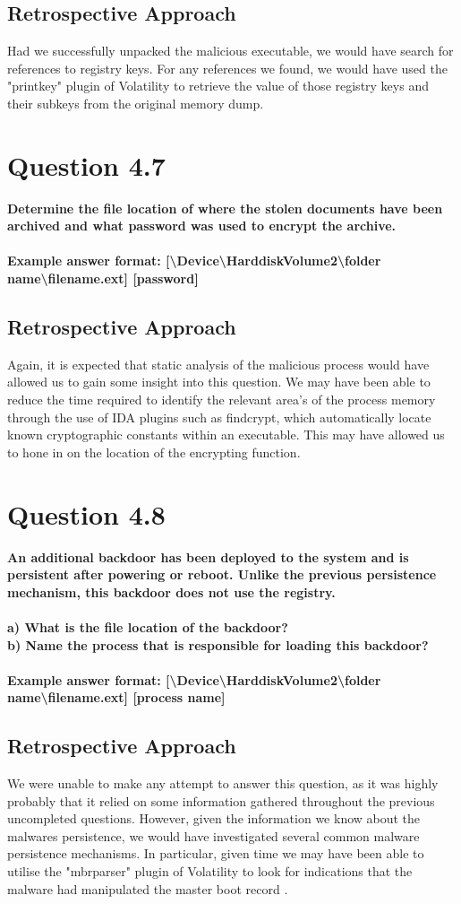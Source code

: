 \subsection{Retrospective Approach}
Had we successfully unpacked the malicious executable, we would have search for references to registry keys. For any references we found, we would have used the "printkey" plugin of Volatility to retrieve the value of those registry keys and their subkeys from the original memory dump.
\section{Question 4.7}
\textbf{Determine the file location of where the stolen documents have been
archived and what password was used to encrypt the archive.
\\\\
Example answer format:
[\textbackslash{}Device\textbackslash{}HarddiskVolume2\textbackslash{}folder
name\textbackslash{}filename.ext] [password]}
\subsection{Retrospective Approach}
Again, it is expected that static analysis of the malicious process would have allowed us to gain some insight into this question. We may have been able to reduce the time required to identify the relevant area's of the process memory through the use of IDA plugins such as findcrypt, which automatically locate known cryptographic constants within an executable. This may have allowed us to hone in on the location of the encrypting function. 
\section{Question 4.8}
\textbf{An additional backdoor has been deployed to the system and is persistent
after powering or reboot. Unlike the previous persistence mechanism, this
backdoor does not use the registry.
\\
\\a) What is the file location of the backdoor?
\\b) Name the process that is responsible for loading this backdoor?
\\\\
Example answer format:
[\textbackslash{}Device\textbackslash{}HarddiskVolume2\textbackslash{}folder
name\textbackslash{}filename.ext] [process name]}
\subsection{Retrospective Approach}
We were unable to make any attempt to answer this question, as it was highly probably that it relied on some information gathered throughout the previous uncompleted questions. However, given the information we know about the malwares persistence, we would have investigated several common malware persistence mechanisms. In particular, given time we may have been able to utilise the "mbrparser" plugin of Volatility to look for indications that the malware had manipulated the master boot record \cite[364]{malcook}. 

